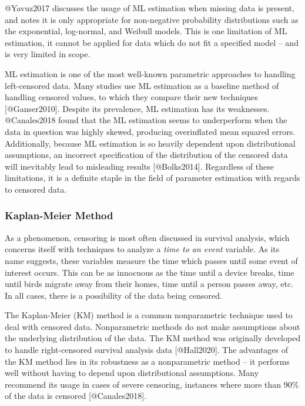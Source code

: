 \documentclass[
]{article}
\begin{document}
@Yavuz2017 discusses the usage of ML estimation when missing data is
present, and notes it is only appropriate for non-negative probability
distributions such as the exponential, log-normal, and Weibull models.
This is one limitation of ML estimation, it cannot be applied for data
which do not fit a specified model -- and is very limited in scope.

ML estimation is one of the most well-known parametric approaches to
handling left-censored data. Many studies use ML estimation as a
baseline method of handling censored values, to which they compare their
new techniques {[}@Ganser2010{]}. Despite its prevalence, ML estimation
has its weaknesses. @Canales2018 found that the ML estimation seems to
underperform when the data in question was highly skewed, producing
overinflated mean squared errors. Additionally, because ML estimation is
so heavily dependent upon distributional assumptions, an incorrect
specification of the distribution of the censored data will inevitably
lead to misleading results {[}@Bolks2014{]}. Regardless of these
limitations, it is a definite staple in the field of parameter
estimation with regards to censored data.

\hypertarget{rkm}{%
\subsubsection{Kaplan-Meier Method}\label{rkm}}

As a phenomenon, censoring is most often discussed in survival analysis,
which concerns itself with techniques to analyze a \emph{time to an
event} variable. As its name suggests, these variables measure the time
which passes until some event of interest occurs. This can be as
innocuous as the time until a device breaks, time until birds migrate
away from their homes, time until a person passes away, etc. In all
cases, there is a possibility of the data being censored.

The Kaplan-Meier (KM) method is a common nonparametric technique used to
deal with censored data. Nonparametric methods do not make assumptions
about the underlying distribution of the data. The KM method was
originally developed to handle right-censored survival analysis data
{[}@Hall2020{]}. The advantages of the KM method lies in its robustness
as a nonparametric method -- it performs well without having to depend
upon distributional assumptions. Many recommend its usage in cases of
severe censoring, instances where more than 90\% of the data is censored
{[}@Canales2018{]}.
\end{document}
